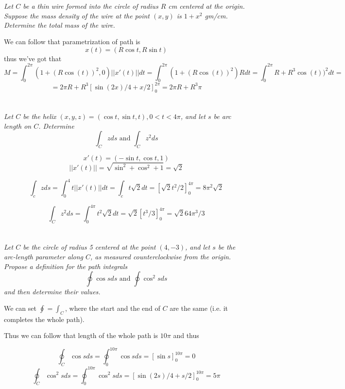 \documentclass[11pt,oneside,titlepage]{book}
\begin{document}
\section{}

\textit{Let $C$ be a thin wire formed into the circle of radius $R$ cm centered at the
  origin. Suppose the mass density of the wire at the point $(x, y)$ is $1 + x^2$ gm/cm.
  Determine the total mass of the wire.}

We can follow that parametrization of path is
$$x(t) = (R \cos t, R \sin t)$$
thus we've got that
$$M = \int_0^{2 \pi}{(1 + (R \cos(t))^2, 0) ||x'(t)|| dt}=
\int_0^{2 \pi}{(1 + (R \cos(t))^2) R dt}=  \int_0^{2 \pi}{R + R^3 \cos(t))^2 dt}=$$
$$ = 
2\pi R + R^3[\sin(2x)/4 + x/2]_0^{2\pi} = 2\pi R + R^3\pi$$

\section{}

\textit{Let $C$  be the helix $(x, y, z) = (\cos t, \sin t, t), 0 < t < 4\pi$, and
  let $s$ be arc length on $C$. Determine }
$$\int_C{z ds} \text{ and } \int_C{z^2 ds}$$

$$x'(t) = (-\sin t, \cos t, 1)$$
$$||x'(t)|| = \sqrt{\sin^2 + \cos^2 + 1} = \sqrt{2}$$

$$\int_c{z ds} = \int_0^4{t ||x'(t)|| dt} = \int_c{t \sqrt{2} dt} = [\sqrt{2}t^2/2]_0^{4\pi} =
8\pi^2\sqrt{2}  $$

$$\int_C{z^2 ds} = \int_0^{4\pi}{t^2 \sqrt{2} dt} = \sqrt{2}[t^3/3]_0^{4\pi} = \sqrt{2}64 \pi^3/3$$

\section{}

\textit{Let $C$ be the circle of radius 5 centered at the point $(4, -3)$, and let $s$ be the
  arc-length parameter along $C$, as measured counterclockwise from the origin. Propose a
  definition for the path integrals}
$$\oint{\cos {s} ds } \text{ and } \oint{\cos^2{s} ds}$$
\textit{and then determine their values.}

We can set $\oint = \int_C$, where the start and the end of $C$ are the same (i.e. it completes
the whole path).

Thus we can follow that length of the whole path is $10 \pi$ and thus

$$\oint_C{\cos{s} ds} = \oint_0^{10\pi}{\cos{s} ds} = [\sin s]_0^{10 \pi} = 0 $$
$$\oint_C{\cos^2{s} ds} = \oint_0^{10\pi}{\cos^2{s} ds} = [\sin (2s)/4 + s/2 ]_0^{10 \pi} = 5 \pi $$
\end{document}
